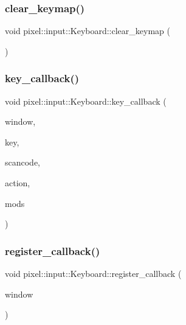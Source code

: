 \subsubsection{\texorpdfstring{clear\+\_\+keymap()}{clear\_keymap()}}
{\footnotesize\ttfamily void pixel\+::input\+::\+Keyboard\+::clear\+\_\+keymap (\begin{DoxyParamCaption}{ }\end{DoxyParamCaption})\hspace{0.3cm}{\ttfamily [static]}}

\mbox{\label{classpixel_1_1input_1_1_keyboard_a56a80cab312b6241d368e77f07f1b126}} 
\subsubsection{\texorpdfstring{key\+\_\+callback()}{key\_callback()}}
{\footnotesize\ttfamily void pixel\+::input\+::\+Keyboard\+::key\+\_\+callback (\begin{DoxyParamCaption}\item[{G\+L\+F\+Wwindow $\ast$}]{window,  }\item[{int}]{key,  }\item[{int}]{scancode,  }\item[{int}]{action,  }\item[{int}]{mods }\end{DoxyParamCaption})\hspace{0.3cm}{\ttfamily [static]}}

\mbox{\label{classpixel_1_1input_1_1_keyboard_abb0164a3125839568abc8447ac671a87}} 
\subsubsection{\texorpdfstring{register\+\_\+callback()}{register\_callback()}}
{\footnotesize\ttfamily void pixel\+::input\+::\+Keyboard\+::register\+\_\+callback (\begin{DoxyParamCaption}\item[{G\+L\+F\+Wwindow $\ast$}]{window }\end{DoxyParamCaption})\hspace{0.3cm}{\ttfamily [static]}}




